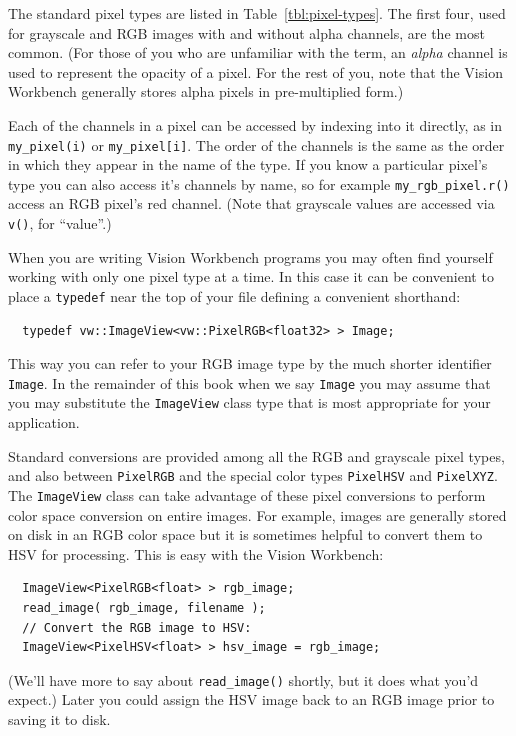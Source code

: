 The standard pixel types are listed in Table~\ref{tbl:pixel-types}.
The first four, used for grayscale and RGB images with and without
alpha channels, are the most common.  (For those of you who are
unfamiliar with the term, an {\it alpha} channel is used to represent
the opacity of a pixel.  For the rest of you, note that the Vision
Workbench generally stores alpha pixels in pre-multiplied form.)

Each of the channels in a pixel can be accessed by indexing into it
directly, as in \verb#my_pixel(i)# or \verb#my_pixel[i]#.  The order
of the channels is the same as the order in which they appear in the
name of the type.  If you know a particular pixel's type you can also
access it's channels by name, so for example \verb#my_rgb_pixel.r()#
access an RGB pixel's red channel.  (Note that grayscale values are
accessed via \verb#v()#, for ``value''.)

When you are writing Vision Workbench programs you may often find
yourself working with only one pixel type at a time.  In this case
it can be convenient to place a \verb#typedef# near the top of your
file defining a convenient shorthand:
\begin{verbatim}
  typedef vw::ImageView<vw::PixelRGB<float32> > Image;
\end{verbatim}
This way you can refer to your RGB image type by the much shorter
identifier \verb#Image#.  In the remainder of this book when we say
\verb#Image# you may assume that you may substitute the
\verb#ImageView# class type that is most appropriate for your
application.

Standard conversions are provided among all the RGB and grayscale pixel
types, and also between \verb#PixelRGB# and the special color types
\verb#PixelHSV# and \verb#PixelXYZ#.  The \verb#ImageView# class can
take advantage of these pixel conversions to perform color space
conversion on entire images.  For example, images are generally stored
on disk in an RGB color space but it is sometimes helpful to convert
them to HSV for processing.  This is easy with the Vision Workbench:
\begin{verbatim}
  ImageView<PixelRGB<float> > rgb_image;
  read_image( rgb_image, filename );
  // Convert the RGB image to HSV:
  ImageView<PixelHSV<float> > hsv_image = rgb_image;
\end{verbatim}
(We'll have more to say about \verb#read_image()# shortly, but it
does what you'd expect.)  Later you could assign the HSV image back
to an RGB image prior to saving it to disk.

